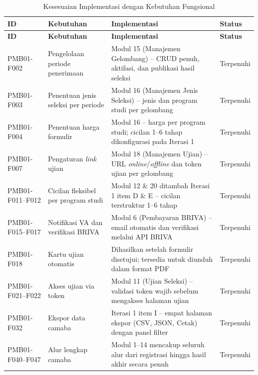 \begin{longtable}{|L{0.12\textwidth}|L{0.21\textwidth}|L{0.36\textwidth}|L{0.13\textwidth}|}
	\caption{Kesesuaian Implementasi dengan Kebutuhan Fungsional}
	\label{table:4.kesesuaian_fungsional}\\
	\hline
	\textbf{ID} & \textbf{Kebutuhan} & \textbf{Implementasi} & \textbf{Status} \\
	\hline
	\endfirsthead
	\hline
	\textbf{ID} & \textbf{Kebutuhan} & \textbf{Implementasi} & \textbf{Status} \\
	\hline
	\endhead
	PMB01-F002 & Pengelolaan periode penerimaan & Modul 15 (Manajemen Gelombang) -- CRUD penuh, aktifasi, dan publikasi hasil seleksi & Terpenuhi \\
	\hline
	PMB01-F003 & Penentuan jenis seleksi per periode & Modul 16 (Manajemen Jenis Seleksi) -- jenis dan program studi per gelombang & Terpenuhi \\
	\hline
	PMB01-F004 & Penentuan harga formulir & Modul 16 -- harga per program studi; cicilan 1--6 tahap dikonfigurasi pada Iterasi 1 & Terpenuhi \\
	\hline
	PMB01-F007 & Pengaturan \textit{link} ujian & Modul 18 (Manajemen Ujian) -- URL \textit{online}/\textit{offline} dan token ujian per gelombang & Terpenuhi \\
	\hline
	PMB01-F011--F012 & Cicilan fleksibel per program studi & Modul 12 \& 20 ditambah Iterasi 1 item D \& E -- cicilan terstruktur 1--6 tahap & Terpenuhi \\
	\hline
	PMB01-F015--F017 & Notifikasi VA dan verifikasi BRIVA & Modul 6 (Pembayaran BRIVA) -- email otomatis dan verifikasi melalui API BRIVA & Terpenuhi \\
	\hline
	PMB01-F018 & Kartu ujian otomatis & Dihasilkan setelah formulir disetujui; tersedia untuk diunduh dalam format PDF & Terpenuhi \\
	\hline
	PMB01-F021--F022 & Akses ujian via token & Modul 11 (Ujian Seleksi) -- validasi token wajib sebelum mengakses halaman ujian & Terpenuhi \\
	\hline
	PMB01-F032 & Ekspor data camaba & Iterasi 1 item I -- empat halaman ekspor (CSV, JSON, Cetak) dengan panel filter & Terpenuhi \\
	\hline
	PMB01-F040--F047 & Alur lengkap camaba & Modul 1--14 mencakup seluruh alur dari registrasi hingga hasil akhir secara penuh & Terpenuhi \\
	\hline
\end{longtable}

